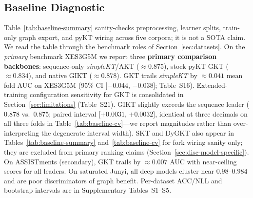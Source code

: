 \documentclass[preprint,10pt,doubleblind]{elsarticle}
\newcommand{\GKTdeltaci}{[$-0.044$, $-0.038$]}
\newcommand{\GIKTdeltaci}{[$+0.0031$, $+0.0032$]}
\begin{document}
\subsection{Baseline Diagnostic}
\label{sec:exp-baseline}

Table~\ref{tab:baseline-summary} sanity-checks preprocessing, learner splits,
train-only graph export, and pyKT wiring across five corpora; it is not a SOTA
claim. We read the table through the benchmark roles of Section~\ref{sec:datasets}.
On the \emph{primary} benchmark XES3G5M we report three \textbf{primary
comparison backbones}: sequence-only \textit{simpleKT}/AKT (${\approx}0.875$),
stock pyKT GKT (${\approx}0.834$), and native GIKT (${\approx}0.878$).
GKT trails \textit{simpleKT} by ${\approx}0.041$ mean fold AUC on XES3G5M
(95\% CI \GKTdeltaci{}; Table~S16). Extended-training configuration
sensitivity for GKT is consolidated in Section~\ref{sec:limitations}
(Table~S21). GIKT slightly exceeds the sequence leader
($0.878$ vs.\ $0.875$; paired interval \GIKTdeltaci{}, identical at three
decimals on all three folds in Table~\ref{tab:baseline-cv}---we report
magnitudes rather than over-interpreting the degenerate interval width).
SKT and DyGKT also appear in Tables~\ref{tab:baseline-summary}
and~\ref{tab:baseline-cv} for fork wiring sanity only; they are excluded from
primary ranking claims (Section~\ref{sec:disc-model-specific}).
On ASSISTments (secondary), GKT trails by ${\approx}0.007$ AUC with
near-ceiling scores for all leaders. On saturated Junyi, all deep models
cluster near $0.98$--$0.984$ and are poor discriminators of graph benefit.
Per-dataset ACC/NLL and bootstrap intervals are in Supplementary Tables~S1--S5.
\end{document}
